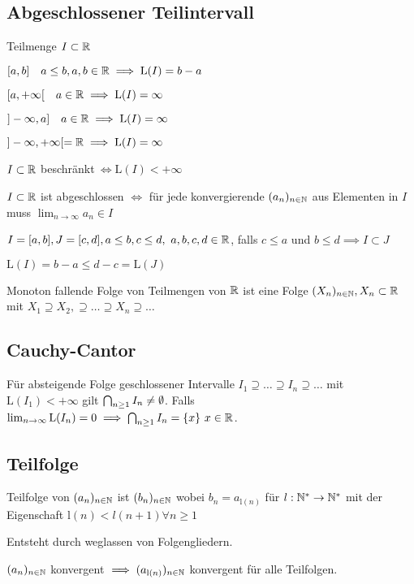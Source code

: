 \subsection{Abgeschlossener Teilintervall}
Teilmenge $I \subset \mathbb{R}$
\begin{compactenum}
    \item $[a, b] \quad a \le b, a,b \in \mathbb{R} \implies \text{L}(I) = b - a$
    \item $[a, +\infty[ \quad a \in \mathbb{R} \implies \text{L}(I) = \infty$
    \item $]-\infty, a] \quad a \in \mathbb{R} \implies \text{L}(I) = \infty$
    \item $]-\infty, +\infty[ = \mathbb{R} \implies \text{L}(I) = \infty$
\end{compactenum}

\begin{compactitem}
    \item $I \subset \mathbb{R}$ beschränkt$ \ \iff \text{L}(I) < + \infty$
    \item $I \subset \mathbb{R}$ ist abgeschlossen $\iff $ für jede konvergierende $(a_n)_{n \in \mathbb{N}}$ aus Elementen in $I$ muss $\lim_{n \to \infty} a_n \in I$
    \item $I=[a, b], J=[c, d], a \le b, c \le d, \ a,b,c,d \in \R$, falls $c \le a$ und $b \le d \implies I \subset J$
        \begin{compactitem}
            \item $\text{L}(I) = b - a \le  d - c = \text{L}(J)$
        \end{compactitem}
    \item Monoton fallende Folge von Teilmengen von $\mathbb{R}$ ist eine Folge $(X_n)_{n \in \mathbb{N}}, X_n \subset \mathbb{R}$ mit $X_1 \supseteq X_2, \supseteq \dots \supseteq X_n \supseteq \dots $
\end{compactitem}

\subsection{Cauchy-Cantor}
Für absteigende Folge geschlossener Intervalle $I_1 \supseteq \dots  \supseteq I_n \supseteq \dots $ mit $\text{L}(I_1) < + \infty$ gilt $\bigcap_{n \ge 1} I_n \neq \emptyset $. Falls $\lim_{n \to \infty} \text{L}(I_n) = 0 \implies \bigcap_{n \ge  1} I_n =\{x\} \ x \in \mathbb{R} $.

\subsection{Teilfolge}
Teilfolge von $(a_n)_{n \in \mathbb{N}}$ ist $(b_n)_{n \in \mathbb{N}}$ wobei $b_n = a_{\text{l}(n)}$ für $l:\mathbb{N}^* \to \mathbb{N}^*$ mit der Eigenschaft $\text{l}(n) < l(n + 1) \forall n \ge 1$
\begin{compactitem}
    \item Entsteht durch weglassen von Folgengliedern.
    \item $(a_n)_{n \in \mathbb{N}}$ konvergent $\implies (a_{\text{l}(n)})_{n \in \mathbb{N}}$ konvergent für alle Teilfolgen.
\end{compactitem}

